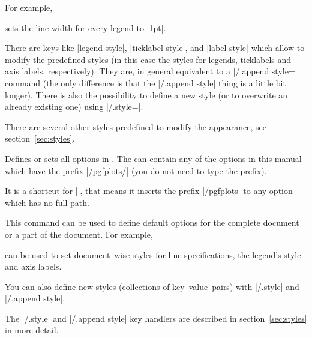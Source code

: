 For example,
\begin{codeexample}
\end{codeexample}
\noindent
sets the line width for every legend to |1pt|. 

There are keys like |legend style|, |ticklabel style|, and |label style| which allow to modify the predefined styles (in this case the styles for legends, ticklabels and axis labels, respectively). They are, in general equivalent to a |/.append style={}| command (the only difference is that the |/.append style| thing is a little bit longer). There is also the possibility to define a new style (or to overwrite an already existing one) using |/.style={}|.

There are several other styles predefined to modify the appearance, see section~\ref{sec:styles}.

\begin{command}{\pgfplotsset{}}
	Defines or sets all options in . The  can contain any of the options in this manual which have the prefix |/pgfplots/| (you do not need to type the prefix).
	
	It is a shortcut for ||, that means it inserts the prefix |/pgfplots| to any option which has no full path.

	This command can be used to define default options for the complete document or a part of the document. For example, 
\begin{codeexample}
\end{codeexample}
	can be used to set document--wise styles for line specifications, the legend's style and axis labels.

	You can also define new styles (collections of key--value--pairs) with |/.style| and |/.append style|.
\begin{codeexample}
\end{codeexample}
	The |/.style| and |/.append style| key handlers are described in section~\ref{sec:styles} in more detail.
\end{command}

